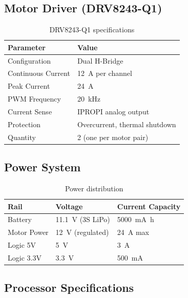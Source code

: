 \documentclass[11pt,letterpaper]{article}
\begin{document}
\subsection{Motor Driver (DRV8243-Q1)}

\begin{table}[H]
\centering
\begin{tabular}{@{}ll@{}}
\toprule
\textbf{Parameter} & \textbf{Value} \\
\midrule
Configuration & Dual H-Bridge \\
Continuous Current & \SI{12}{\ampere} per channel \\
Peak Current & \SI{24}{\ampere} \\
PWM Frequency & \SI{20}{\kilo\hertz} \\
Current Sense & IPROPI analog output \\
Protection & Overcurrent, thermal shutdown \\
Quantity & 2 (one per motor pair) \\
\bottomrule
\end{tabular}
\caption{DRV8243-Q1 specifications}
\end{table}

\subsection{Power System}

\begin{table}[H]
\centering
\begin{tabular}{@{}lll@{}}
\toprule
\textbf{Rail} & \textbf{Voltage} & \textbf{Current Capacity} \\
\midrule
Battery & \SI{11.1}{\volt} (3S LiPo) & \SI{5000}{\milli\ampere\hour} \\
Motor Power & \SI{12}{\volt} (regulated) & \SI{24}{\ampere} max \\
Logic 5V & \SI{5}{\volt} & \SI{3}{\ampere} \\
Logic 3.3V & \SI{3.3}{\volt} & \SI{500}{\milli\ampere} \\
\bottomrule
\end{tabular}
\caption{Power distribution}
\end{table}

\subsection{Processor Specifications}
\end{document}
